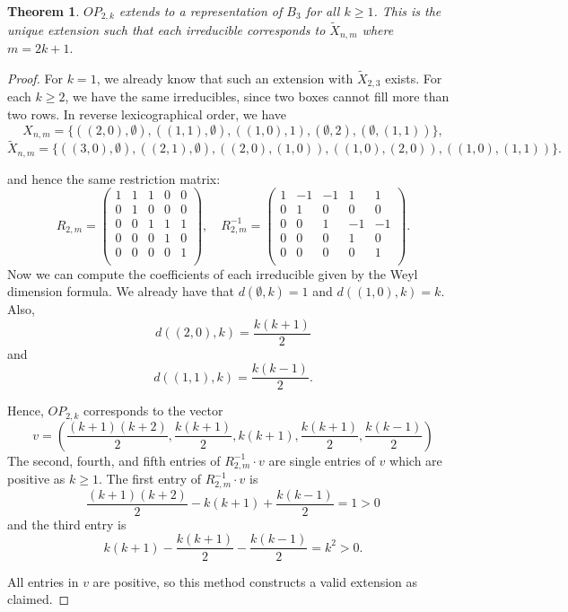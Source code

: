 \documentclass{amsart}
\theoremstyle{plain}
\newtheorem{theorem}{Theorem}[section]
\theoremstyle{definition}
\begin{document}
\begin{theorem}
$OP_{2,k}$ extends to a representation of $B_3$ for all $k \geq 1$. This is the unique extension such that each irreducible corresponds to $\tilde{X}_{n,m}$ where $m=2k+1.$
\end{theorem}
\begin{proof}
For $k=1$, we already know that such an extension with $\tilde{X}_{2,3}$ exists. For each $k\ge 2$, we have the same irreducibles, since two boxes cannot fill more than two rows. In reverse lexicographical order,  we have 
$$X_{n,m}= \{ ((2,0),\emptyset),((1,1),\emptyset),((1,0),1),(\emptyset, 2),(\emptyset,(1,1))\},$$
$$\tilde X_{n,m}= \{((3,0),\emptyset),((2,1),\emptyset),((2,0),(1,0)),((1,0),(2,0)),((1,0),(1,1))\}.$$



and hence the same restriction matrix: 
$$ R_{2,m}= \begin{pmatrix}
1 & 1 & 1 & 0 & 0 \\
0 & 1 & 0 & 0 & 0 \\
0 & 0 & 1 & 1 & 1 \\
0 & 0 & 0 & 1 & 0 \\
0 & 0 & 0 & 0 & 1 \\
\end{pmatrix}, \quad R_{2,m}^{-1}= \begin{pmatrix}
1 & -1 & -1 & 1 & 1 \\
0 & 1 & 0 & 0 & 0 \\
0 & 0 & 1 & -1 & -1 \\
0 & 0 & 0 & 1 & 0 \\
0 & 0 & 0 & 0 & 1 \\
\end{pmatrix}.$$ 
Now we can compute the coefficients of each irreducible given by the Weyl dimension formula.  We already have that $d(\emptyset,k)=1$ and $d((1,0),k)=k.$ Also, 
$$d((2,0),k)= \frac{k(k+1)}{2}$$
and 
$$d((1,1),k)= \frac{k(k-1)}{2}.$$

Hence, $OP_{2,k}$ corresponds to the vector
$$v= \left( \frac{(k+1)(k+2)}{2},\frac{k(k+1)}{2}, k(k+1), \frac{k(k+1)}{2}, \frac{k(k-1)}{2}\right)$$
The second, fourth, and fifth entries of $R_{2,m}^{-1} \cdot v$ are single entries of $v$ which are positive as $k \geq 1$.
The first entry of $R_{2,m}^{-1}\cdot v$ is 
$$\frac{(k+1)(k+2)}{2} - k(k+1) + \frac{k(k-1)}{2} = 1 > 0$$ 
and the third entry is 
$$ k(k+1)- \frac{k(k+1)}{2}- \frac{k(k-1)}{2} = k^2 >0.$$

All entries in $v$ are positive, so this method constructs a valid extension as claimed.
\end{proof}
\end{document}
